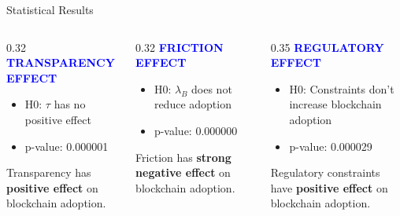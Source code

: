 \documentclass{beamer}
\begin{document}
\begin{frame}{Statistical Results}
  \begin{columns}[T]
    \begin{column}{0.32\textwidth}
      \centering
      \textcolor{blue}{\textbf{TRANSPARENCY EFFECT}}
      
      \vspace{0.5em}
      
      \begin{itemize}
        \item H0: $\tau$ has no positive effect
        \item p-value: 0.000001
      \end{itemize}
      
      \vspace{1em}
      
      Transparency has \textbf{positive effect} on blockchain adoption.
    \end{column}
    
    \begin{column}{0.32\textwidth}
      \centering
      \textcolor{blue}{\textbf{FRICTION EFFECT}}
      
      \vspace{0.5em}
      
      \begin{itemize}
        \item H0: $\lambda_B$ does not reduce adoption
        \item p-value: 0.000000
      \end{itemize}
      
      \vspace{1em}
      
      Friction has \textbf{strong negative effect} on blockchain adoption.
    \end{column}
    
    \begin{column}{0.35\textwidth}
      \centering
      \textcolor{blue}{\textbf{REGULATORY EFFECT}}
      
      \vspace{0.5em}
      
      \begin{itemize}
        \item H0: Constraints don't increase blockchain adoption
        \item p-value: 0.000029
      \end{itemize}
      
      \vspace{1em}
      
      Regulatory constraints have \textbf{positive effect} on blockchain adoption.
    \end{column}
  \end{columns}
\end{frame}
\end{document}
